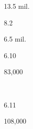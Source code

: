 \begin{description}[font=\normalfont,style=nextline]
\begin{multicols}{2}
\begin{description}[font=\normalfont\itshape,noitemsep]
 \item[]
\item[\nativespeakers] 13.5 mil. 
 \item[\region] \regionGreece 
 \end{description}\end{multicols}
\item[\langnameGuarani] 
 \begin{multicols}{2}\begin{description}[font=\normalfont\itshape,noitemsep] 
 \item[] 
 \item[\pbnumberabbr] 8.2 
 \item[\family] \famTupian 
 \item[]
 \item[]
 \item[\nativespeakers] 6.5 mil. 
 \item[\region] \regionParaguay\EnumComma\regionBolivia\EnumComma\regionArgentina\EnumComma\regionBrazil 
 \end{description}\end{multicols}
\item[\langnameGyarung] 
 \begin{multicols}{2}\begin{description}[font=\normalfont\itshape,noitemsep] 
 \item[] 
 \item[\pbnumberabbr] 6.10 
 \item[\family] \famSinoTibetan 
 \item[]
\item[\nativespeakers] 83,000 
 \item[\region] \regionSichuan\ \Brackets{\regionChina}
 \end{description}\end{multicols}
\item[\langnameHakhun] 
 \begin{multicols}{2}\begin{description}[font=\normalfont\itshape,noitemsep] 
 \item[] 
 \item[\pbnumberabbr] 6.11 
 \item[\family] \famSinoTibetan 
 \item[]
\item[\nativespeakers] 108,000 
 \item[\region] \regionBurma\EnumComma\regionIndia 
 \end{description}\end{multicols}

\end{description}
